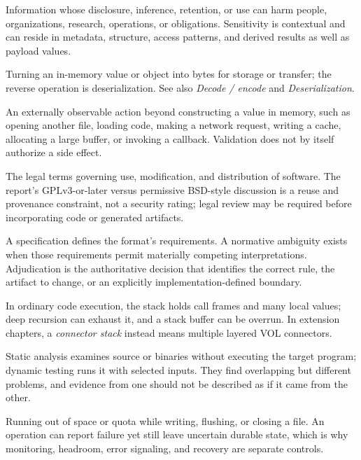 \documentclass[../main.tex]{subfiles}
\begin{document}
\begin{description}[leftmargin=1.5em,style=nextline]
\item[Sensitive information.]
Information whose disclosure, inference, retention, or use can harm people,
organizations, research, operations, or obligations. Sensitivity is contextual
and can reside in metadata, structure, access patterns, and derived results as
well as payload values.

\item[Serialization.]
Turning an in-memory value or object into bytes for storage or transfer; the
reverse operation is deserialization. See also \emph{Decode / encode} and
\emph{Deserialization}.

\item[Side effect.]
An externally observable action beyond constructing a value in memory, such as
opening another file, loading code, making a network request, writing a cache,
allocating a large buffer, or invoking a callback. Validation does not by
itself authorize a side effect.

\item[Software license.]
The legal terms governing use, modification, and distribution of software.
The report's GPLv3-or-later versus permissive BSD-style discussion is a reuse
and provenance constraint, not a security rating; legal review may be required
before incorporating code or generated artifacts.

\item[Specification / normative ambiguity / adjudication.]
A specification defines the format's requirements. A normative ambiguity
exists when those requirements permit materially competing interpretations.
Adjudication is the authoritative decision that identifies the correct rule,
the artifact to change, or an explicitly implementation-defined boundary.

\item[Stack.]
In ordinary code execution, the stack holds call frames and many local values;
deep recursion can exhaust it, and a stack buffer can be overrun. In extension
chapters, a \emph{connector stack} instead means multiple layered VOL
connectors.

\item[Static analysis / dynamic testing.]
Static analysis examines source or binaries without executing the target
program; dynamic testing runs it with selected inputs. They find overlapping
but different problems, and evidence from one should not be described as if it
came from the other.

\item[Storage exhaustion.]
Running out of space or quota while writing, flushing, or closing a file. An
operation can report failure yet still leave uncertain durable state, which is
why monitoring, headroom, error signaling, and recovery are separate controls.


\end{description}
\end{document}
